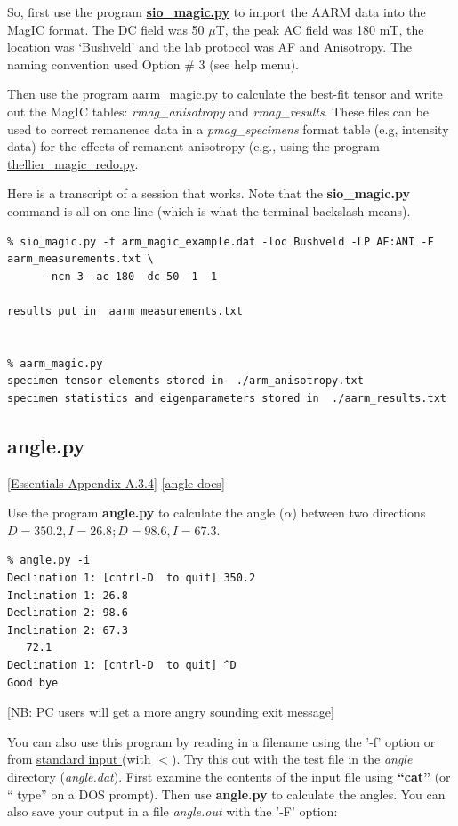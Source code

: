 \documentclass[11pt]{book}
\begin{document}
{{So,  first use the program \href{#sio_magic.py}{\bf sio\_magic.py}  to import the AARM data  into the MagIC format.  The DC field was 50 $\mu$T, the peak AC field was 180 mT, the location was `Bushveld' and the lab protocol was AF and Anisotropy.   The naming convention used Option \# 3 (see help menu). 

Then use the program \href{#aarm_magic.py}{aarm\_magic.py}  to calculate the best-fit tensor and write out the MagIC tables: {\it rmag\_anisotropy} and {\it rmag\_results}.   These files can be used to correct remanence data in a {\it pmag\_specimens} format table (e.g, intensity data) for the effects of remanent anisotropy (e.g., using the program \href{#thellier_magic.py}{thellier\_magic\_redo.py}.

Here is a transcript of a session that works.   Note that the {\bf  sio\_magic.py}  command is all on one line (which is what the terminal backslash means).  

\begin{verbatim}
% sio_magic.py -f arm_magic_example.dat -loc Bushveld -LP AF:ANI -F aarm_measurements.txt \
      -ncn 3 -ac 180 -dc 50 -1 -1

results put in  aarm_measurements.txt


% aarm_magic.py 
specimen tensor elements stored in  ./arm_anisotropy.txt
specimen statistics and eigenparameters stored in  ./aarm_results.txt

\end{verbatim}


%
\subsection{angle.py } [\href{http://magician.ucsd.edu/Essentials_2/WebBook2ap1.html#Vector_multiplication}{Essentials Appendix A.3.4}]
\href{http://earthref.org/PmagPy/pmagpydocs/angle-module.html}{[angle docs]}


 Use the program {\bf angle.py} to calculate the angle ($\alpha$) between two directions $D=350.2, I=26.8; D=98.6, I=67.3$. 

\begin{verbatim}
% angle.py -i
Declination 1: [cntrl-D  to quit] 350.2
Inclination 1: 26.8
Declination 2: 98.6
Inclination 2: 67.3
   72.1 
Declination 1: [cntrl-D  to quit] ^D
Good bye 
\end{verbatim}
 [NB: PC users will get a more angry sounding exit message]
 
 You can also use this program by reading in a filename using the '-f' option or from \href{#standard_IO}{standard input }(with $<$).  Try this out with the test file in the {\it angle} directory ({\it angle.dat}).  First examine the contents of the input file using {\bf ``cat''} (or `` type'' on a DOS prompt).  Then use {\bf angle.py} to calculate the angles.  You can also save your output in a file {\it angle.out} with the '-F' option:
 
}}
\end{document}
